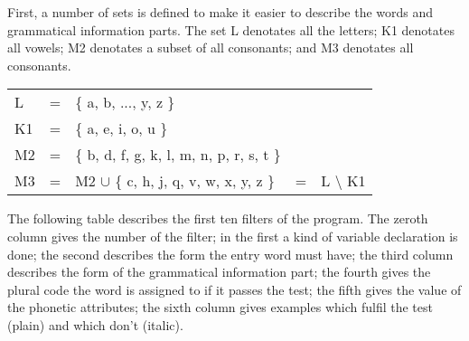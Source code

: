 First, a number of sets is defined to make it easier to describe the words and
grammatical information parts. The set L denotates all the letters; K1 
denotates all vowels; M2 denotates a subset of all consonants; and M3 denotates 
all consonants.

\begin{tabular}{lclcl}
L   & = & \{ a, b, ..., y, z \} & & \\
K1  & = & \{ a, e, i, o, u \} & & \\
M2  & = & \{ b, d, f, g, k, l, m, n, p, r, s, t \} & & \\
M3  & = & M2 $\cup$ \{ c, h, j, q, v, w, x, y, z \} & = & L $\setminus$ K1
\end{tabular}

The following table describes the first ten filters of the program. The zeroth
column gives the number of the filter; in the first a kind of variable 
declaration is done; the second describes the form the entry word must have; 
the third column describes the form of the grammatical information part; the 
fourth gives the plural code the word is assigned to if it passes the test;
the fifth gives the value of the phonetic attributes; the sixth column 
gives examples which fulfil the test (plain) and which don't (italic).

